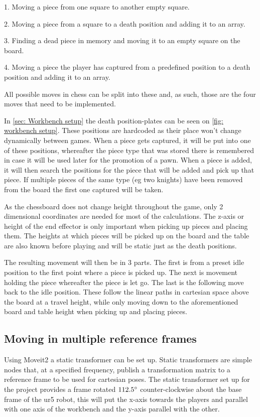 1. Moving a piece from one square to another empty square. 

2. Moving a piece from a square to a death position and adding it to an array. 

3. Finding a dead piece in memory and moving it to an empty square on the board. 

4. Moving a piece the player has captured from a predefined position to a death position and adding it to an array.

All possible moves in chess can be split into these and, as such, those are the four moves that need to be implemented.

In \cref{sec: Workbench setup} the death position-plates can be seen on \cref{fig: workbench setup}. These positions are hardcoded as their place won't change dynamically between games. 
When a piece gets captured, it will be put into one of these positions, whereafter the piece type that was stored there is remembered in case it will be used later for the promotion of a pawn. When a piece is added, it will then search the positions for the piece that will be added and pick up that piece. If multiple pieces of the same type (eg two knights) have been removed from the board the first one captured will be taken.

As the chessboard does not change height throughout the game, only 2 dimensional coordinates are needed for most of the calculations. The z-axis or height of the end effector is only important when picking up pieces and placing them. The heights at which pieces will be picked up on the board and the table are also known before playing and will be static just as the death positions. 

The resulting movement will then be in 3 parts. The first is from a preset idle position to the first point where a piece is picked up. The next is movement holding the piece whereafter the piece is let go. The last is the following move back to the idle position. These follow the linear paths in cartesian space above the board at a travel height, while only moving down to the aforementioned board and table height when picking up and placing pieces.

\subsection{Moving in multiple reference frames}

Using Moveit2 a static transformer can be set up. Static transformers are simple nodes that, at a specified frequency, publish a transformation matrix to a reference frame to be used for cartesian poses.\cite{6556373} The static transformer set up for the project provides a frame rotated $112.5 \degree$ counter-clockwise about the base frame of the ur5 robot, this will put the x-axis towards the players and parallel with one axis of the workbench and the y-axis parallel with the other.

